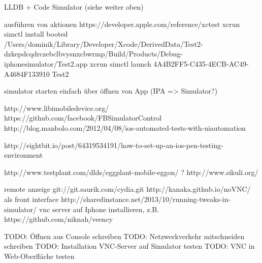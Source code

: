 LLDB + Code Simulator (siehe weiter oben)

ausführen von aktionen https://developer.apple.com/reference/xctest
xcrun simctl install booted /Users/dominik/Library/Developer/Xcode/DerivedData/Test2-dzkepdcqdrczebclbvysnxcbwrmp/Build/Products/Debug-iphonesimulator/Test2.app
xcrun simctl launch 4A4B2FF5-C435-4ECB-AC49-A4684F133910 Test2

simulator starten einfach über öffnen von App (IPA => Simulator?)

http://www.libimobiledevice.org/
https://github.com/facebook/FBSimulatorControl
http://blog.manbolo.com/2012/04/08/ios-automated-tests-with-uiautomation

http://eightbit.io/post/64319534191/how-to-set-up-an-ios-pen-testing-environment

http://www.testplant.com/dlds/eggplant-mobile-eggon/ ?
http://www.sikuli.org/

remote anzeige
git://git.saurik.com/cydia.git
http://kanaka.github.io/noVNC/ als front interface
http://sharedinstance.net/2013/10/running-tweaks-in-simulator/ vnc server auf Iphone installieren, z.B. https://github.com/niknah/veency

TODO: Öffnen aus Console schreiben
TODO: Netzwerkverkehr mitschneiden schreiben
TODO: Installation VNC-Server auf Simulator testen
TODO: VNC in Web-Oberfläche testen
